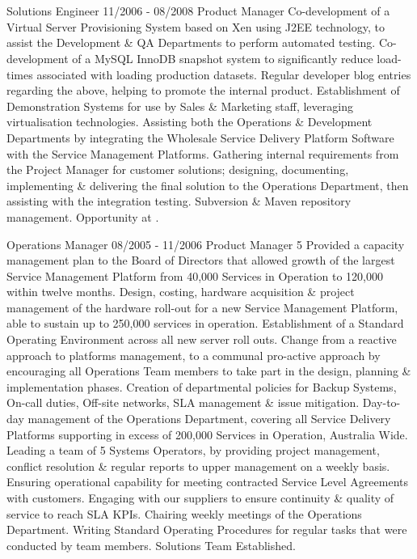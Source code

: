 \section{\DOT}

\lskip
{} Solutions Engineer
 11/2006 - 08/2008
 Product Manager
 Co-development of a Virtual Server Provisioning System based on Xen using J2EE technology, to assist the Development \& QA Departments to perform automated testing.
\dashtopic Co-development of a MySQL InnoDB snapshot system to significantly reduce load-times associated with loading production datasets.
\dashtopic Regular developer blog entries regarding the above, helping to promote the internal product.
\dashtopic Establishment of Demonstration Systems for use by Sales \& Marketing staff, leveraging virtualisation technologies.
 Assisting both the Operations \& Development Departments by integrating the Wholesale Service Delivery Platform Software with the Service Management Platforms.
\dashtopic Gathering internal requirements from the Project Manager for customer solutions; designing, documenting, implementing \& delivering the final solution to the Operations Department, then assisting with the integration testing.
\dashtopic Subversion \& Maven repository management.
 Opportunity at \ATL.
\pskip

 Operations Manager
\lskip
{} 08/2005 - 11/2006
 Product Manager
 5
 Provided a capacity management plan to the Board of Directors that allowed growth of the largest Service Management Platform from 40,000 Services in Operation to 120,000 within twelve months.
\dashtopic Design, costing, hardware acquisition \& project management of the hardware roll-out for a new Service Management Platform, able to sustain up to 250,000 services in operation.
\dashtopic Establishment of a Standard Operating Environment across all new server roll outs.
\dashtopic Change from a reactive approach to platforms management, to a communal pro-active approach by encouraging all Operations Team members to take part in the design, planning \& implementation phases.
\dashtopic Creation of departmental policies for Backup Systems, On-call duties, Off-site networks, SLA management \& issue mitigation.
 Day-to-day management of the Operations Department, covering all Service Delivery Platforms supporting in excess of 200,000 Services in Operation, Australia Wide.
\dashtopic Leading a team of 5 Systems Operators, by providing project management, conflict resolution \& regular reports to upper management on a weekly basis.
\dashtopic Ensuring operational capability for meeting contracted Service Level Agreements with customers.
\dashtopic Engaging with our suppliers to ensure continuity \& quality of service to reach SLA KPIs.
\dashtopic Chairing weekly meetings of the Operations Department.
\dashtopic Writing Standard Operating Procedures for regular tasks that were conducted by team members.
 Solutions Team Established.
\pskip

